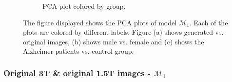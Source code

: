 \documentclass[11pt, fleqn, titlepage]{article}
\newcommand{\1}[1]{\mathds{1}\left[#1\right]}
\begin{document}
\begin{figure}[H]
\begin{subfigure}[t]{0.5\textwidth}
		\caption{PCA plot colored by group.}
	\end{subfigure}
	
	\caption{The figure displayed shows the PCA plots of model $ \mathcal M_1 $. Each of the plots are colored by different labels. Figure (a) shows generated vs. original images, (b) shows male vs. female and (c) shows the Alzheimer patients vs. control group. }
	\label{fig:pca_gen}
\end{figure}

\vspace*{-0.2cm}

\subsubsection{Original 3T \& original 1.5T images - $ \mathcal M_1 $} 
\end{document}
